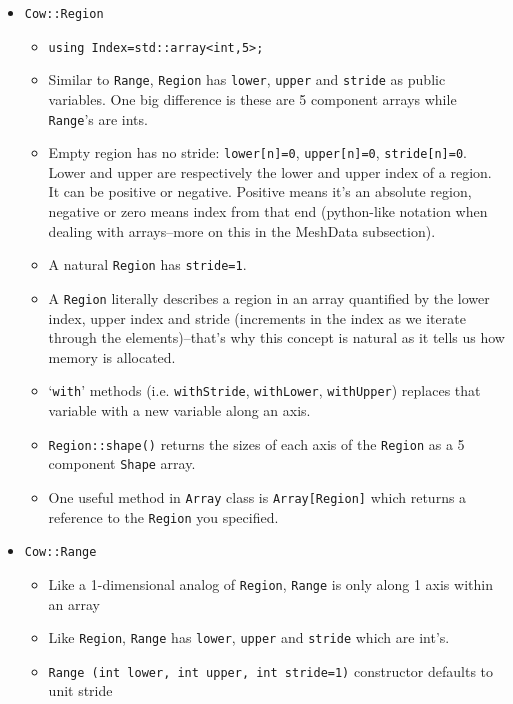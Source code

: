 \documentclass{article}
\begin{document}
\begin{itemize}
\begin{itemize}
	\end{itemize}
	\item \texttt{Cow::Region}
	\begin{itemize}
		\item \texttt{using Index=std::array<int,5>;}
		\item Similar to \texttt{Range}, \texttt{Region} has \texttt{lower}, \texttt{upper} and \texttt{stride} as public variables. One big difference is these are 5 component arrays while \texttt{Range}'s are ints.
		\item Empty region has no stride: \texttt{lower[n]=0}, \texttt{upper[n]=0}, \texttt{stride[n]=0}. Lower and upper are respectively the lower and upper index of a region. It can be positive or negative. Positive means it's an absolute region, negative or zero means index from that end (python-like notation when dealing with arrays--more on this in the MeshData subsection). 
		\item A natural \texttt{Region} has \texttt{stride=1}.
		\item A \texttt{Region} literally describes a region in an array quantified by the lower index, upper index and stride (increments in the index as we iterate through the elements)--that's why this concept is natural as it tells us how memory is allocated. 
		\item `\texttt{with}' methods (i.e. \texttt{withStride}, \texttt{withLower}, \texttt{withUpper}) replaces that variable with a new variable along an axis.
		\item \texttt{Region::shape()} returns the sizes of each axis of the \texttt{Region} as a 5 component \texttt{Shape} array.
		\item One useful method in \texttt{Array} class is \texttt{Array[Region]} which returns a reference to the \texttt{Region} you specified.
	\end{itemize}
	
	\item \texttt{Cow::Range}
	\begin{itemize}
		\item Like a 1-dimensional analog of \texttt{Region}, \texttt{Range} is only along 1 axis within an array
		\item Like \texttt{Region}, \texttt{Range} has \texttt{lower}, \texttt{upper} and \texttt{stride} which are int's.
		\item \texttt{Range (int lower, int upper, int stride=1)} constructor defaults to unit stride
	\end{itemize}
\end{itemize}
\end{document}
